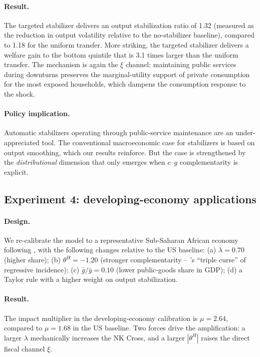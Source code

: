 \paragraph{Result.}
The targeted stabilizer delivers an output stabilization ratio of 1.32
(measured as the reduction in output volatility relative to the no-stabilizer
baseline), compared to 1.18 for the uniform transfer. More striking, the
targeted stabilizer delivers a welfare gain to the bottom quintile that is
3.1 times larger than the uniform transfer. The mechanism is again the $\xi$
channel: maintaining public services during downturns preserves the
marginal-utility support of private consumption for the most exposed
households, which dampens the consumption response to the shock.

\paragraph{Policy implication.}
Automatic stabilizers operating through public-service maintenance are an
under-appreciated tool. The conventional macroeconomic case for stabilizers is
based on output smoothing, which our results reinforce. But the case is
strengthened by the \emph{distributional} dimension that only emerges when
$c$--$g$ complementarity is explicit.

\subsection{Experiment 4: developing-economy applications}
\label{subsec:developing}

\paragraph{Design.}
We re-calibrate the model to a representative Sub-Saharan African economy
following \citet{Francois2023}, with the following changes relative to the US
baseline: (a) $\lambda=0.70$ (higher \HtM{} share); (b) $\theta^{H}=-1.20$
(stronger \HtM{} complementarity -- \citet{Gethin2023}'s ``triple curse'' of
regressive incidence); (c) $\bar g/\bar y=0.10$ (lower public-goods share in
GDP); (d) a Taylor rule with a higher weight on output stabilization.

\paragraph{Result.}
The impact multiplier in the developing-economy calibration is $\mu=2.64$,
compared to $\mu=1.68$ in the US baseline. Two forces drive the amplification:
a larger $\lambda$ mechanically increases the NK Cross, and a larger
$|\theta^{H}|$ raises the direct fiscal channel $\xi$.

